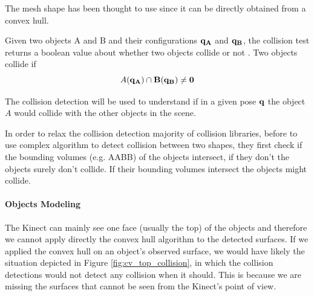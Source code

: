 The mesh shape has been thought to use since it can be directly obtained from a convex hull. 

Given two objects A and B and their configurations $\bf{q_A}$ and $\bf{q_B}$, the collision test returns a boolean value about whether two objects collide or not \citep{pan2012fcl}. Two objects collide if
\[
A(\bf{q_A}) \cap B(\bf{q_B}) \neq 0
\]

The collision detection will be used to understand if in a given pose $\bf{q}$ the object $A$ would collide with the other objects in the scene.

In order to relax the collision detection majority of collision libraries, before to use complex algorithm to detect collision between two shapes, they first check if the bounding volumes (e.g. AABB) of the objects intersect, if they don't the objects surely don't collide. If their bounding volumes intersect the objects might collide.

\paragraph{Objects Modeling}
The Kinect can mainly see one face (usually the top) of the objects and therefore we cannot apply directly the convex hull algorithm to the detected surfaces. If we applied the convex hull on an object's observed surface, we would have likely the situation depicted in Figure \ref{fig:cv_top_collision}, in which the collision detections would not detect any collision when it should. This is because we are missing the surfaces that cannot be seen from the Kinect's point of view.

